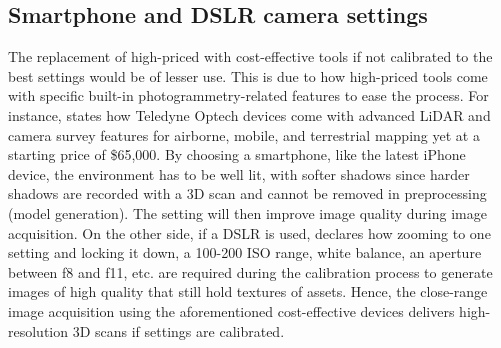 \documentclass[conference]{IEEEtran}
\begin{document}
\subsection{Smartphone and DSLR camera settings}

The replacement of high-priced with cost-effective tools if not calibrated to the best settings would be of lesser use. This is due to how high-priced tools come with specific built-in photogrammetry-related features to ease the process. For instance, \cite{Geo3D2019} states how Teledyne Optech devices come with advanced LiDAR and camera survey features for airborne, mobile, and terrestrial mapping yet at a starting price of \$65,000. By choosing a smartphone, like the latest iPhone device, the environment has to be well lit, with softer shadows since harder shadows are recorded with a 3D scan and cannot be removed in preprocessing (model generation). The setting will then improve image quality during image acquisition. On the other side, if a DSLR is used, \cite{calib} declares how zooming to one setting and locking it down, a 100-200 ISO range, white balance, an aperture between f8 and f11, etc. are required during the calibration process to generate images of high quality that still hold textures of assets. Hence, the close-range image acquisition using the aforementioned cost-effective devices delivers high-resolution 3D scans if settings are calibrated.
\end{document}
